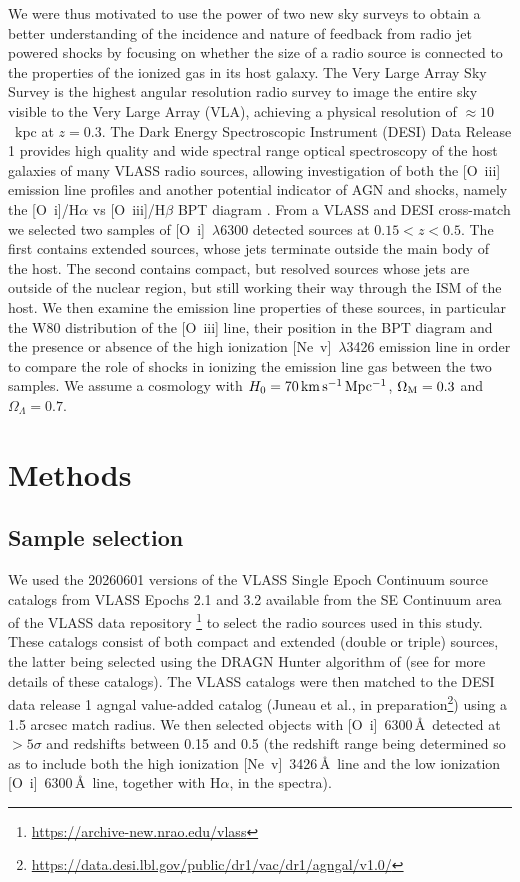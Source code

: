 \documentclass[linenumbers,trackchanges]{aastex701}
\begin{document}
We were thus motivated to use the power of two new sky surveys to obtain a better understanding of the incidence and nature of feedback from radio jet powered shocks by 
focusing on whether the size of a radio source is connected to the properties of the ionized gas in its host galaxy. The Very Large Array Sky Survey \citep[VLASS;][]{lacy2020} is the highest angular resolution radio survey to image the entire sky visible to the Very Large Array (VLA), achieving a physical resolution of $\approx 10$~kpc at $z=0.3$. The Dark Energy Spectroscopic Instrument (DESI) Data Release 1  \citep{DESI26}
provides high quality and wide spectral range optical spectroscopy of the host galaxies of many VLASS radio sources, allowing investigation of both the [O~{\sc iii}] emission line profiles and another potential indicator of AGN and shocks, namely the [O~{\sc i}]/H$\alpha$ vs [O~{\sc iii}]/H$\beta$ BPT diagram \citep{BPT, VO87, Allen08}. 
From a VLASS and DESI cross-match we selected two samples of [O~{\sc i}]~$\lambda$6300 detected sources at $0.15 < z < 0.5$. The first contains extended sources, whose jets terminate outside the main body of the host. The second contains compact, but resolved sources whose jets are outside of the nuclear region, but still working their way through the ISM of the host.
We then examine the emission line properties of these sources, in particular the W80 distribution of the [O~{\sc iii}] line, their position in the BPT diagram and the presence or absence of the high ionization [Ne~{\sc v}]~$\lambda$3426 emission line in order to compare the role of shocks in ionizing the emission line gas between the two samples. We assume a cosmology with $H_0=70\,{\rm km\,s^{-1}\,Mpc^{-1}}$, $\Omega_{\rm M}=0.3$ and $\Omega_{\Lambda}=0.7$.

\section{Methods}

\subsection{Sample selection}

We used the 20260601 versions of the VLASS Single Epoch Continuum source catalogs from VLASS Epochs 2.1 and 3.2 available from the SE Continuum area of the VLASS data repository \footnote{\url{https://archive-new.nrao.edu/vlass}} to select the radio sources used in this study. These catalogs consist of both compact and extended (double or triple) sources, the latter being selected using the DRAGN Hunter algorithm of \citet{gordon23} (see \citet{kimball26} for more details of these catalogs).
The VLASS catalogs were then matched to the DESI data release 1 {\sc agngal} value-added catalog (Juneau et al., in preparation\footnote{\url{https://data.desi.lbl.gov/public/dr1/vac/dr1/agngal/v1.0/}}) using a 1.5 arcsec match radius. We then selected objects with [O~{\sc i}]~6300\,\AA\ detected at $>5\sigma$ and redshifts between 0.15 and 0.5 (the redshift range being determined so as to include both the high ionization [Ne~{\sc v}]~3426\,\AA\ line and the low ionization [O~{\sc i}]~6300\,\AA\ line, together with H$\alpha$, in the spectra). 
\end{document}
